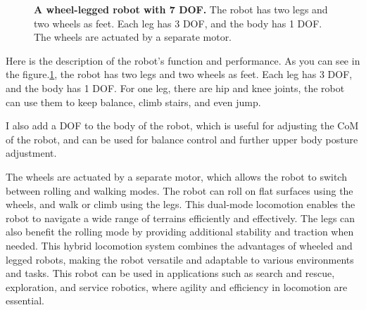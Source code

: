 \documentclass{article}
\begin{document}
\begin{figure}[h!]
  \centering
  \caption{\textbf{A wheel-legged robot with 7 DOF.} The robot has two legs and two wheels as feet. 
  Each leg has 3 DOF, and the body has 1 DOF. The wheels are actuated by a separate motor.}
    \label{fig:wheel-legged-robot}
\end{figure}


Here is the description of the robot's function and performance. As you can see in the figure.\ref{fig:wheel-legged-robot}, 
the robot has two legs and two wheels as feet. Each leg has 3 DOF, and the body has 1 DOF. For one leg, there are hip and knee joints, the robot can use them to keep balance, climb stairs, and even jump.

I also add a DOF to the body of the robot, which is useful for adjusting the CoM of the robot, and can be used for balance control and further upper body posture adjustment.

The wheels are actuated by a separate motor, which allows the robot to switch between rolling and walking modes. The robot can roll on flat surfaces using the wheels, and walk or climb using the legs. This dual-mode locomotion enables the robot to navigate a wide range of terrains efficiently and effectively.
The legs can also benefit the rolling mode by providing additional stability and traction when needed. This hybrid locomotion system combines the advantages of wheeled and legged robots, 
making the robot versatile and adaptable to various environments and tasks. This robot can be used in applications such as search and rescue, exploration, and service robotics, where agility and efficiency in locomotion are essential.
\newpage
\end{document}
